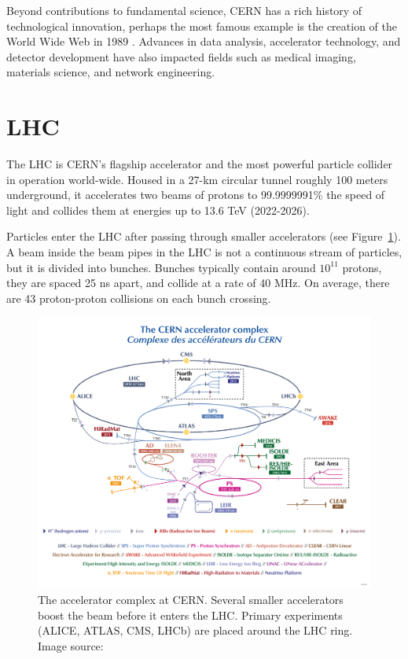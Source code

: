 Beyond contributions to fundamental science, \ac{CERN} has a rich history of technological innovation, perhaps the most famous example is the creation of the World Wide Web in 1989 \cite{www-proposal}. Advances in data analysis, accelerator technology, and detector development have also impacted fields such as medical imaging, materials science, and network engineering.

\clearpage
\section{\acs{LHC}}
\label{sec:lhc-experiments}

The \ac{LHC} \cite{Lebrun:1284331, Brüning:782076} is \ac{CERN}'s flagship accelerator and the most powerful particle collider in operation world-wide. Housed in a 27-km circular tunnel roughly 100 meters underground, it accelerates two beams of protons to 99.9999991\% the speed of light and collides them at energies up to 13.6 \ac{TeV} (2022-2026).

Particles enter the \ac{LHC} after passing through smaller accelerators (see Figure~\ref{fig:cern-complex}). A beam inside the beam pipes in the \ac{LHC} is not a continuous stream of particles, but it is divided into bunches. Bunches typically contain around $10^{11}$ protons, they are spaced 25 ns apart, and collide at a rate of 40 MHz. On average, there are 43 proton-proton collisions on each bunch crossing.

\begin{figure}[htbp]
\centering
\includegraphics[width=\textwidth]{images/introduction/cern-experiments.png}
\caption{The accelerator complex at \acs{CERN}. Several smaller accelerators boost the beam before it enters the \acs{LHC}. Primary experiments (\acs{ALICE}, \acs{ATLAS}, \acs{CMS}, \acs{LHCb}) are placed around the \acs{LHC} ring. Image source: \protect\cite{cern_accelerator_complex}}
\label{fig:cern-complex}
\end{figure}

